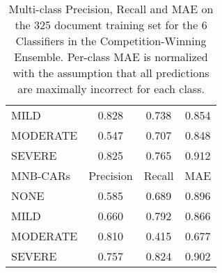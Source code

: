 \begin{table}[]
\begin{tabular}{|l|c|c|c|}
    \textsf{MILD} & \cellcolor{gray!15} 0.828 & 0.738 & 0.854 \\
    \textsf{MODERATE} & 0.547 & 0.707 & 0.848 \\
    \textsf{SEVERE} & 0.825 & \cellcolor{gray!15} 0.765 & \cellcolor{gray!15} 0.912 \\
   \hline
   \cellcolor{gray!15} \textsf{MNB-CARs} & \textsf{Precision} & \textsf{Recall} & \textsf{MAE} \\
   \hline
    \textsf{NONE} & 0.585 & 0.689 & 0.896 \\
    \textsf{MILD} & 0.660 & \cellcolor{gray!15} 0.792 & 0.866 \\
    \textsf{MODERATE} & \cellcolor{gray!15} 0.810 & 0.415 & 0.677 \\
    \textsf{SEVERE} & 0.757 & 0.824 & \cellcolor{gray!15} 0.902 \\
   \hline
    \end{tabular}
    \caption{Multi-class Precision, Recall and MAE on the 325 document training set for the 6 Classifiers in the Competition-Winning Ensemble. Per-class MAE is normalized with the assumption that all predictions are maximally incorrect for each class.}
    \label{tab:BestEnsembleClassifiersMetrics}
\end{table}

